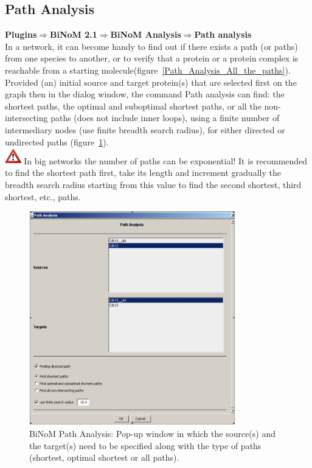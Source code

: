 \subsection{Path Analysis}\label{Path_Analysis}
\textbf{Plugins$\Rightarrow$BiNoM 2.1$\Rightarrow$BiNoM Analysis$\Rightarrow$Path analysis}\\
In a network, it can become handy to find out if there exists a path (or paths) from one species to another, or to verify that a protein or a protein complex is reachable from a starting molecule(figure~\ref{Path_Analysis_All_the_paths}). Provided (an) initial source and target protein(s) that are selected first on the graph then in the dialog window, the command Path analysis can find: the shortest paths, the optimal and suboptimal shortest paths, or all the non-intersecting paths (does not include inner loops), using a finite number of intermediary nodes (use finite breadth search radius), for either directed or undirected paths (figure~\ref{Path_Analysis_Pop-up_window}).\\
\includegraphics[width=20pt,height=20pt]{graphics/warning} In big networks the number of paths can be exponential! It is recommended to find the shortest path first, take its length and increment gradually the breadth search radius starting from this value to find the second shortest, third shortest, etc., paths.\\
\begin{figure}
\centering
\includegraphics[width=0.8\textwidth]{graphics/Path_Analysis_Pop-up_window}
\caption{BiNoM Path Analysis: Pop-up window in which the source(s) and the target(s) need to be specified along with the type of paths (shortest, optimal shortest or all paths).}
\label{Path_Analysis_Pop-up_window}
\end{figure}
